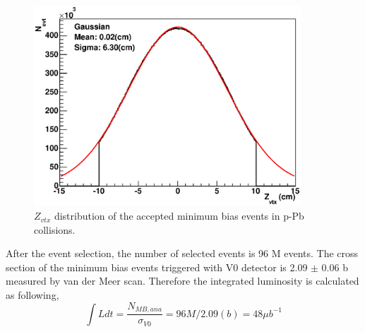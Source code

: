\begin{figure}[!h]
  \centering
  \includegraphics[width=10cm]{chap4/figure/QA/Zvtx_INT7.eps}
  \caption{$Z_{vtx}$ distribution of the accepted minimum bias events in p-Pb collisions.}
  \label{fig_4_zvtx}
\end{figure}

After the event selection, the number of selected events is 96 M events. 
The cross section of the minimum bias events triggered with V0 detector is 2.09 $\pm$ 0.06 b measured by van der Meer scan\cite{bib_v0cross}. 
Therefore the integrated luminosity is calculated as following, 
\begin{equation}
  \int{Ldt} = \frac{N_{MB,ana}}{\sigma_{V0}} = 96 M / 2.09 (b) = 48 \mu b^{-1}
\end{equation}



